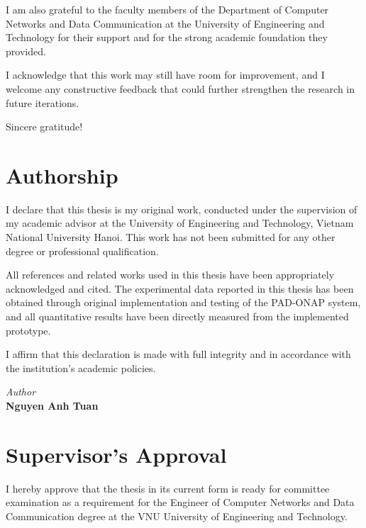 \documentclass[12pt, a4paper, reqno, oneside]{book}
\begin{document}
I am also grateful to the faculty members of the Department of Computer Networks and Data Communication at the University of Engineering and Technology for their support and for the strong academic foundation they provided.

I acknowledge that this work may still have room for improvement, and I welcome any constructive feedback that could further strengthen the research in future iterations.

Sincere gratitude!

\newpage

\chapter*{Authorship}
\vspace{20pt}

I declare that this thesis is my original work, conducted under the supervision of my academic advisor at the University of Engineering and Technology, Vietnam National University Hanoi. This work has not been submitted for any other degree or professional qualification.

All references and related works used in this thesis have been appropriately acknowledged and cited. The experimental data reported in this thesis has been obtained through original implementation and testing of the \textsc{PAD-ONAP} system, and all quantitative results have been directly measured from the implemented prototype.

I affirm that this declaration is made with full integrity and in accordance with the institution's academic policies.

\begin{flushright}
{\it Author}\\[2cm]
{\bf Nguyen Anh Tuan}
\end{flushright}
\newpage

\chapter*{Supervisor's Approval}
\vspace{20pt}

I hereby approve that the thesis in its current form is ready for committee examination as a requirement for the Engineer of Computer Networks and Data Communication degree at the VNU University of Engineering and Technology.
\end{document}
